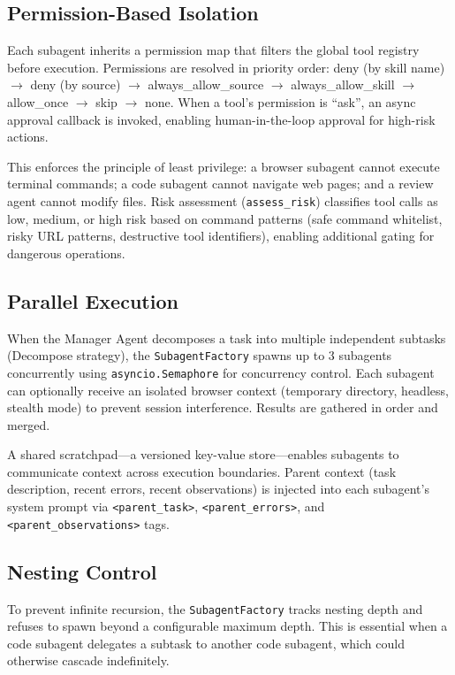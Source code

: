 \subsection{Permission-Based Isolation}

Each subagent inherits a permission map that filters the global tool registry before execution. Permissions are resolved in priority order: deny (by skill name) $\rightarrow$ deny (by source) $\rightarrow$ always\_allow\_source $\rightarrow$ always\_allow\_skill $\rightarrow$ allow\_once $\rightarrow$ skip $\rightarrow$ none. When a tool's permission is ``ask'', an async approval callback is invoked, enabling human-in-the-loop approval for high-risk actions.

This enforces the principle of least privilege: a browser subagent cannot execute terminal commands; a code subagent cannot navigate web pages; and a review agent cannot modify files. Risk assessment (\texttt{assess\_risk}) classifies tool calls as low, medium, or high risk based on command patterns (safe command whitelist, risky URL patterns, destructive tool identifiers), enabling additional gating for dangerous operations.

\subsection{Parallel Execution}

When the Manager Agent decomposes a task into multiple independent subtasks (Decompose strategy), the \texttt{SubagentFactory} spawns up to 3 subagents concurrently using \texttt{asyncio.Semaphore} for concurrency control. Each subagent can optionally receive an isolated browser context (temporary directory, headless, stealth mode) to prevent session interference. Results are gathered in order and merged.

A shared scratchpad---a versioned key-value store---enables subagents to communicate context across execution boundaries. Parent context (task description, recent errors, recent observations) is injected into each subagent's system prompt via \texttt{<parent\_task>}, \texttt{<parent\_errors>}, and \texttt{<parent\_observations>} tags.

\subsection{Nesting Control}

To prevent infinite recursion, the \texttt{SubagentFactory} tracks nesting depth and refuses to spawn beyond a configurable maximum depth. This is essential when a code subagent delegates a subtask to another code subagent, which could otherwise cascade indefinitely.
